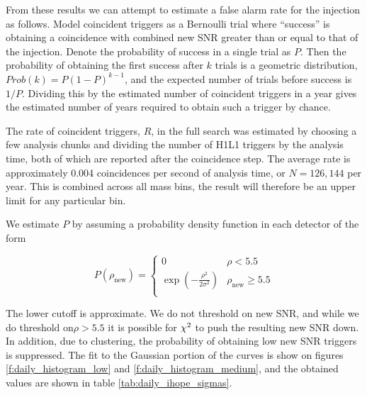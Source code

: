 From these results we can attempt to estimate a false alarm rate for
the injection as follows.   Model coincident triggers as a Bernoulli
trial where ``success'' is obtaining a coincidence with combined new
SNR greater than or equal to that of the injection.  Denote the
probability of success in a single trial as $P$.  Then the probability
of obtaining the first success after $k$ trials is a geometric
distribution, $Prob(k) = P(1-P)^{k-1}$, and the expected number of
trials before success is $1/P$.  Dividing this by the estimated number
of coincident triggers in a year gives the estimated number of years
required to obtain such a trigger by chance.

The rate of coincident triggers, $R$, in the full search was estimated
by choosing a few analysis chunks and dividing the number of H1L1
triggers by the analysis time, both of which are reported after the
coincidence step.  The average rate is approximately 0.004
coincidences per second of analysis time, or $N=126,144$ per year.
This is combined across all mass bins, the result will therefore be an
upper limit for any particular bin.

%
%
%
%


We estimate $P$ by assuming a probability density function in each
detector of the form

\begin{equation}
P(\rho_\textrm{new}) = \left\{
  \begin{array}{lr}
    0  & \rho < 5.5 \\
    \exp\left(-\frac{\rho^2}{2\sigma^2}\right) & \rho_\textrm{new} \geq 5.5 \\
  \end{array} \right.
\end{equation}

The lower cutoff is approximate.  We do not threshold on new SNR, and
while we do threshold on$\rho > 5.5$ it is possible for $\chi^2$ to
push the resulting new SNR down.  In addition, due to clustering, the
probability of obtaining low new SNR triggers is suppressed.  The fit
to the Gaussian portion of the curves is show on  figures
\ref{f:daily_histogram_low} and \ref{f:daily_histogram_medium}, and
the obtained values are shown in table \ref{tab:daily_ihope_sigmas}.

